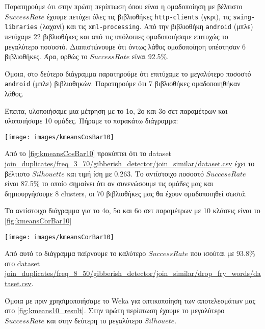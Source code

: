 Παρατηρούμε ότι στην πρώτη περίπτωση όπου είναι η ομαδοποίηση με βέλτιστο $Success Rate$ έχουμε πετύχει όλες τις βιβλιοθήκες \texttt{http-clients} (γκρι), τις \texttt{swing-libraries} (λαχανί) και τις \texttt{xml-processing}. Από την βιβλιοθήκη \texttt{android} (μπλε) πετύχαμε 22 βιβλιοθήκες και από τις υπόλοιπες ομαδοποιήσαμε επιτυχώς το μεγαλύτερο ποσοστό.
Διαπιστώνουμε ότι όντως λάθος ομαδοποίηση υπέστησαν 6 βιβλιοθήκες.
Άρα, ορθώς το $Success Rate$ είναι 92.5\%.

Όμοια, στο δεύτερο διάγραμμα παρατηρούμε ότι επιτύχαμε το μεγαλύτερο ποσοστό \texttt{android} (μπλε) βιβλιοθηκών.
Παρατηρούμε ότι 7 βιβλιοθήκες ομαδοποιηθήκαν λάθος. 

Έπειτα, υλοποιήσαμε μια μέτρηση με το 1ο, 2ο και 3ο σετ παραμέτρων και υλοποιήσαμε 10 ομάδες. Πήραμε το παρακάτω διάγραμμα:

\noindent\begin{minipage}{\linewidth}
    \centering
    \texttt{[image: images/kmeansCosBar10]}
    \label{fig:kmeansCosBar10}
\end{minipage}

Από το 
\hyperref[fig:kmeansCosBar10]{\figurename{} \ref{fig:kmeansCosBar10}}
προκύπτει ότι το dataset \url{join_duplicates/freq_3_70/gibberish_detector/join_similar/dataset.csv} έχει το βέλτιστο $Silhouette$ και τιμή ίση με 0.263. Το αντίστοιχο ποσοστό $SuccessRate$ είναι 87.5\% το οποίο σημαίνει ότι αν συνενώσουμε τις ομάδες μας και δημιουργήσουμε 8 clusters, οι 70 βιβλιοθήκες μας θα έχουν ομαδοποιηθεί σωστά.

Το αντίστοιχο διάγραμμα για το 4ο, 5ο και 6ο σετ παραμέτρων με 10 κλάσεις είναι το
\hyperref[fig:kmeansCorBar10]{\figurename{} \ref{fig:kmeansCorBar10}}

\noindent\begin{minipage}{\linewidth}
    \centering
    \texttt{[image: images/kmeansCorBar10]}
    \label{fig:kmeansCorBar10}
\end{minipage}

Από αυτό το διάγραμμα παίρνουμε το καλύτερο $SuccessRate$ που ισούται με 93.8\% στο dataset \url{join_duplicates/freq_8_50/gibberish_detector/join_similar/drop_fry_words/dataset.csv}.

Όμοια με πριν χρησιμοποιήσαμε το Weka για οπτικοποίηση των αποτελεσμάτων μας
στο \hyperref[fig:kmeans10_result]{\figurename{} \ref{fig:kmeans10_result}}.
Στην πρώτη περίπτωση έχουμε το μεγαλύτερο $Success Rate$ και στην δεύτερη το μεγαλύτερο $Silhouete$.


